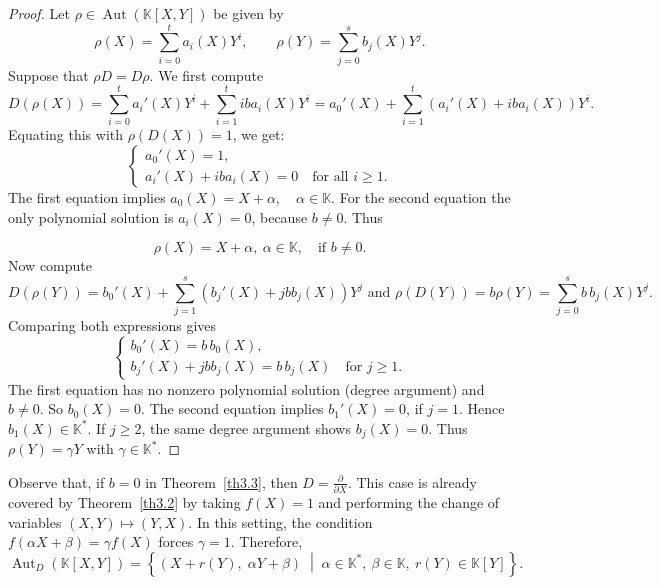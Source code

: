 \documentclass[11pt,a4paper,reqno]{amsart}
\begin{document}
\begin{proof}
Let $\rho \in \operatorname{Aut}(\mathbb{K}[X,Y])$ be given by
\[
\rho(X) = \sum_{i=0}^t a_i(X) Y^i, \qquad \rho(Y) = \sum_{j=0}^s b_j(X) Y^j.
\]
Suppose that $\rho D = D \rho$. We first compute
\[
D(\rho(X)) = \sum_{i=0}^t a_i'(X) Y^i + \sum_{i=1}^t i b a_i(X) Y^i = a_0'(X) + \sum_{i=1}^t \left( a_i'(X) + i b a_i(X) \right) Y^i.
\]
Equating this with $\rho(D(X)) = 1$, we get:
\[
\begin{cases}
a_0'(X) = 1, \\
a_i'(X) + i b a_i(X) = 0 \quad \text{for all } i \geq 1.
\end{cases}
\]
The first equation implies $a_0(X) = X + \alpha, \quad \alpha \in \mathbb{K}$. For the second equation the only polynomial solution is $a_i(X)=0$, because   $b \neq 0$. Thus

\[
\rho(X) = X + \alpha,\ \alpha \in \mathbb{K}, \quad \text{if }   b \neq 0.
\]
Now compute
\[
D(\rho(Y)) = b_0'(X) + \sum_{j=1}^s \left( b_j'(X) + j b b_j(X) \right) Y^j
\mbox{ and }
\rho(D(Y)) = b \rho(Y) = \sum_{j=0}^s b\, b_j(X) Y^j.
\]
Comparing both expressions gives
\[
\begin{cases}
b_0'(X) = b\, b_0(X), \\
b_j'(X) + j b b_j(X) = b\, b_j(X) \quad \text{for } j\geq 1.
\end{cases}
\]
The first equation has no nonzero polynomial solution (degree argument) and $b\neq 0$. So $b_0(X) = 0$. The second equation implies    $b_1'(X)=0$, if $j=1$. Hence $b_1(X)\in\mathbb{K}^*$. If $j\geq 2$, the same degree argument shows $b_j(X)=0$. Thus
$\rho(Y) = \gamma Y$ with  $\gamma \in \mathbb{K}^*$.

\end{proof}

Observe that, if $b = 0$ in Theorem~\ref{th3.3}, then $D = \frac{\partial}{\partial X}$. This case is already covered by Theorem~\ref{th3.2} by taking $f(X) = 1$ and performing the change of variables $(X,Y) \mapsto (Y,X)$. In this setting, the condition $f(\alpha X + \beta) = \gamma f(X)$ forces $\gamma = 1$. Therefore,
    \[
    \operatorname{Aut}_D(\mathbb{K}[X,Y]) = \left\{ (X + r(Y),\; \alpha Y + \beta) \;\middle|\; \alpha\in \mathbb{K}^*,\ \beta \in \mathbb{K},\ r(Y) \in \mathbb{K}[Y] \right\}.
    \]
   
\end{document}
